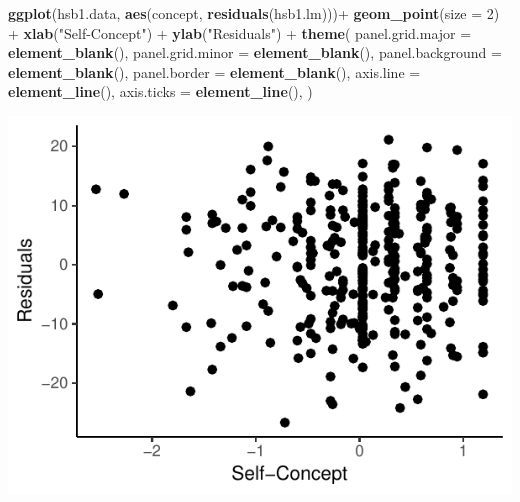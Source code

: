 \documentclass[]{article}
\newenvironment{Shaded}{\begin{snugshade}}{\end{snugshade}}
\newcommand{\KeywordTok}[1]{\textcolor[rgb]{0.13,0.29,0.53}{\textbf{{#1}}}}
\newcommand{\DataTypeTok}[1]{\textcolor[rgb]{0.13,0.29,0.53}{{#1}}}
\newcommand{\DecValTok}[1]{\textcolor[rgb]{0.00,0.00,0.81}{{#1}}}
\newcommand{\StringTok}[1]{\textcolor[rgb]{0.31,0.60,0.02}{{#1}}}
\newcommand{\NormalTok}[1]{{#1}}
\begin{document}
\begin{Shaded}
\begin{Highlighting}[]
\KeywordTok{ggplot}\NormalTok{(hsb1.data, }\KeywordTok{aes}\NormalTok{(concept, }\KeywordTok{residuals}\NormalTok{(hsb1.lm)))+}\StringTok{ }\KeywordTok{geom_point}\NormalTok{(}\DataTypeTok{size =} \DecValTok{2}\NormalTok{) +}\StringTok{ }\KeywordTok{xlab}\NormalTok{(}\StringTok{"Self-Concept"}\NormalTok{) +}\StringTok{ }\KeywordTok{ylab}\NormalTok{(}\StringTok{"Residuals"}\NormalTok{) +}
\StringTok{   }\KeywordTok{theme}\NormalTok{(}
        \DataTypeTok{panel.grid.major =} \KeywordTok{element_blank}\NormalTok{(),}
        \DataTypeTok{panel.grid.minor =} \KeywordTok{element_blank}\NormalTok{(),}
        \DataTypeTok{panel.background =} \KeywordTok{element_blank}\NormalTok{(),}
        \DataTypeTok{panel.border =} \KeywordTok{element_blank}\NormalTok{(),}
        \DataTypeTok{axis.line =} \KeywordTok{element_line}\NormalTok{(),}
        \DataTypeTok{axis.ticks =} \KeywordTok{element_line}\NormalTok{(),}
     \NormalTok{)}
\end{Highlighting}
\end{Shaded}

\includegraphics{Homework_3_Revised_Minoo_files/figure-latex/unnamed-chunk-4-2.pdf}
\end{document}
